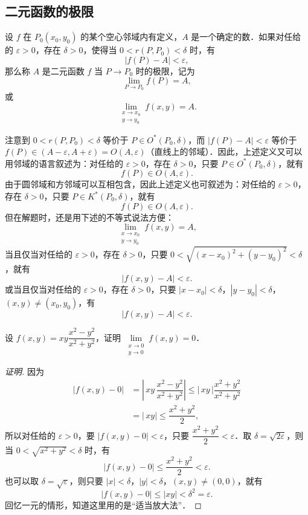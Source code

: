 \subsection{二元函数的极限}

\begin{definition}\label{def:15-5}
设 $f$ 在 $P_{0}(x_{0},y_{0})$ 的某个空心邻域内有定义，$A$ 是一个确定的数．如果对任给的 $\varepsilon>0$，存在 $\delta>0$，使得当 $0<r(P,P_{0})<\delta$ 时，有
\[
\left|f(P)-A\right|<\varepsilon,
\]
那么称 $A$ 是二元函数 $f$ 当 $P\to P_{0}$ 时的极限，记为
\[
\lim_{P\to P_{0}}f(P)=A,
\]
或
\[
\lim_{\substack{x\to x_{0}\\ y\to y_{0}}}f(x,y)=A.
\]
\end{definition}

注意到 $0<r(P,P_{0})<\delta$ 等价于 $P\in O^{*}(P_{0},\delta)$，而 $\left|f(P)-A\right|<\varepsilon$ 等价于 $f(P)\in(A-\varepsilon,A+\varepsilon)=O(A,\varepsilon)$（直线上的邻域）．因此，上述定义又可以用邻域的语言叙述为：对任给的 $\varepsilon>0$，存在 $\delta>0$，只要 $P\in O^{*}(P_{0},\delta)$，就有
\[
f(P)\in O(A,\varepsilon).
\]
由于圆邻域和方邻域可以互相包含，因此上述定义也可叙述为：对任给的 $\varepsilon>0$，存在 $\delta>0$，只要 $P\in K^{*}(P_{0},\delta)$，就有
\[
f(P)\in O(A,\varepsilon).
\]
但在解题时，还是用下述的不等式说法方便：
\[
\lim_{\substack{x\to x_{0}\\ y\to y_{0}}}f(x,y)=A,
\]
当且仅当对任给的 $\varepsilon>0$，存在 $\delta>0$，只要 $0<\sqrt{\left(x-x_{0}\right)^{2}+\left(y-y_{0}\right)^{2}}<\delta$，就有
\[
\left|f(x,y)-A\right|<\varepsilon.
\]
或当且仅当对任给的 $\varepsilon>0$，存在 $\delta>0$，只要 $\left|x-x_{0}\right|<\delta$，$\left|y-y_{0}\right|<\delta$，$(x,y)\neq(x_{0},y_{0})$，有
\[
\left|f(x,y)-A\right|<\varepsilon.
\]

\begin{example}\label{ex:15-2-4}
设 $f(x,y)=xy\dfrac{x^{2}-y^{2}}{x^{2}+y^{2}}$，证明 $\lim\limits_{\substack{x\to0\\y\to0}}f(x,y)=0$．
\end{example}

\begin{proof}[证明]
因为
\[
\begin{aligned}
\left|f(x,y)-0\right|&=\left|\,xy\,\dfrac{x^{2}-y^{2}}{x^{2}+y^{2}}\right|\leqslant\left|\,xy\,\right|\dfrac{x^{2}+y^{2}}{x^{2}+y^{2}}\\
&=\left|\,xy\right|\leqslant\dfrac{x^{2}+y^{2}}{2},
\end{aligned}
\]
所以对任给的 $\varepsilon>0$，要 $\left|f(x,y)-0\right|<\varepsilon$，只要 $\dfrac{x^{2}+y^{2}}{2}<\varepsilon$．取 $\delta=\sqrt{2\varepsilon}$，则当 $0<\sqrt{x^{2}+y^{2}}<\delta$ 时，有
\[
\left|f(x,y)-0\right|\leqslant\dfrac{x^{2}+y^{2}}{2}<\varepsilon.
\]
也可以取 $\delta=\sqrt{\varepsilon}$，则只要 $\left|x\right|<\delta$，$\left|y\right|<\delta$，$(x,y)\neq(0,0)$，就有
\[
\left|f(x,y)-0\right|\leqslant\left|xy\right|<\delta^{2}=\varepsilon.
\]
回忆一元的情形，知道这里用的是“适当放大法”．
\end{proof}

